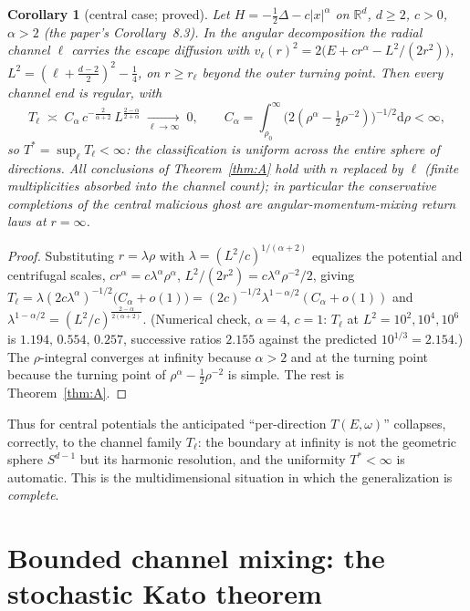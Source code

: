 \documentclass[11pt]{article}
\newtheorem{corollary}[theorem]{Corollary}
\theoremstyle{remark}
\newcommand{\dd}{\mathrm{d}}
\newcommand{\R}{\mathbb{R}}
\begin{document}
\begin{corollary}[central case; proved]\label{cor:central}
Let $H=-\tfrac12\Delta-c|x|^{\alpha}$ on $\R^{d}$, $d\ge2$, $c>0$,
$\alpha>2$ (the paper's Corollary~8.3).  In the angular decomposition
the radial channel $\ell$ carries the escape diffusion with
$v_{\ell}(r)^{2}=2\bigl(E+cr^{\alpha}-L^{2}/(2r^{2})\bigr)$,
$L^{2}=(\ell+\tfrac{d-2}{2})^{2}-\tfrac14$, on $r\ge r_{\ell}$ beyond
the outer turning point.  Then every channel end is regular, with
\[
T_{\ell}\;\asymp\;C_{\alpha}\,c^{-\frac{2}{\alpha+2}}\,
L^{\frac{2-\alpha}{2+\alpha}}\;\xrightarrow[\ell\to\infty]{}\;0,
\qquad
C_{\alpha}=\int_{\rho_{0}}^{\infty}
\bigl(2(\rho^{\alpha}-\tfrac12\rho^{-2})\bigr)^{-1/2}\dd\rho<\infty,
\]
so $T^{*}=\sup_{\ell}T_{\ell}<\infty$: the classification is uniform
across the entire sphere of directions.  All conclusions of
Theorem~\ref{thm:A} hold with $n$ replaced by $\ell$ (finite
multiplicities absorbed into the channel count); in particular the
conservative completions of the central malicious ghost are
angular-momentum-mixing return laws at $r=\infty$.
\end{corollary}

\begin{proof}
Substituting $r=\lambda\rho$ with $\lambda=(L^{2}/c)^{1/(\alpha+2)}$
equalizes the potential and centrifugal scales,
$cr^{\alpha}=c\lambda^{\alpha}\rho^{\alpha}$,
$L^{2}/(2r^{2})=c\lambda^{\alpha}\rho^{-2}/2$, giving
$T_{\ell}=\lambda(2c\lambda^{\alpha})^{-1/2}
\bigl(C_{\alpha}+o(1)\bigr)
=(2c)^{-1/2}\lambda^{1-\alpha/2}(C_{\alpha}+o(1))$ and
$\lambda^{1-\alpha/2}=(L^{2}/c)^{\frac{2-\alpha}{2(\alpha+2)}}$.
(Numerical check, $\alpha=4$, $c=1$: $T_{\ell}$ at
$L^{2}=10^{2},10^{4},10^{6}$ is $1.194,\,0.554,\,0.257$, successive
ratios $2.155$ against the predicted $10^{1/3}=2.154$.)  The
$\rho$-integral converges at infinity because $\alpha>2$ and at the
turning point because the turning point of
$\rho^{\alpha}-\tfrac12\rho^{-2}$ is simple.  The rest is
Theorem~\ref{thm:A}.
\end{proof}

Thus for central potentials the anticipated ``per-direction
$T(E,\omega)$'' collapses, correctly, to the channel family
$T_{\ell}$: the boundary at infinity is not the geometric sphere
$S^{d-1}$ but its harmonic resolution, and the uniformity
$T^{*}<\infty$ is automatic.  This is the multidimensional situation in
which the generalization is \emph{complete}.

\section{Bounded channel mixing: the stochastic Kato theorem}
\label{sec:bounded}
\end{document}
